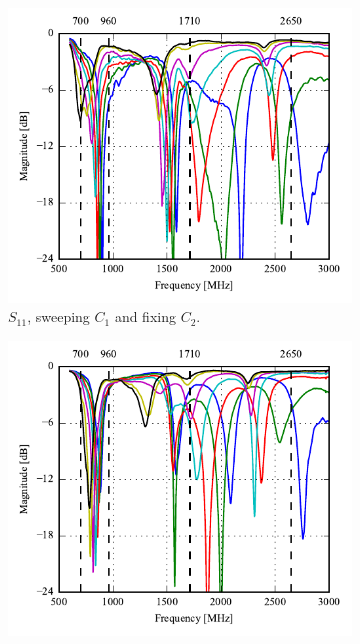 \begin{figure}[htbp]
   \begin{subfigure}[b]{0.49\linewidth}
        \centering
        \includegraphics{img/tech_sol/monopole/prototype_v2/meas_s11_csh1}
        \caption{$S_{11}$, sweeping $C_1$ and fixing $C_2$.}
    \end{subfigure}
    \hfill
    \begin{subfigure}[b]{0.49\linewidth}
        \centering
        \includegraphics{img/tech_sol/monopole/prototype_v2/meas_s22_csh2}

\end{subfigure}
\end{figure}
